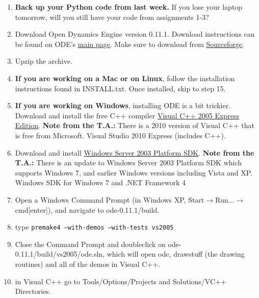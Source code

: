 \documentclass[12pt]{article}
\begin{document}
\begin{enumerate}

\item \textbf{Back up your Python code from last week.} If you lose your laptop tomorrow, will you still have your code from assignments 1-3?

\item Download Open Dynamics Engine version 0.11.1. Download instructions can be found on ODE's
\href{http://ode.org/}{\underline{main page}}. Make sure to download from \href{http://sourceforge.net/projects/opende/files/}{\underline{Sourceforge}}.

\item Upzip the archive.

\item \textbf{If you are working on a Mac or on Linux}, follow the installation instructions found in INSTALL.txt. Once installed, skip to step 15.

\item \textbf{If you are working on Windows}, installing ODE is a bit trickier. Download and install the free C++ compiler
\href{http://www.softpedia.com/get/Programming/Other-Programming-Files/Microsoft-Visual-C-Toolkit.shtml}
{\underline{Visual C++ 2005 Express Edition}}. \textbf{Note from the T.A.:} There is a 2010 version of Visual C++ that is free from Microsoft. Visual Studio 2010 Express (includes C++).

\item Download and install \href{http://www.microsoft.com/downloads/en/details.aspx?FamilyId=0BAF2B35-C656-4969-ACE8-E4C0C0716ADB&displaylang=en}
{\underline{Windows Server 2003 Platform SDK}}. \textbf{Note from the T.A.:} There is an update to Windows Server 2003 Platform SDK which supports Windows 7, and earlier Windows versions including Vista and XP. Windows SDK for Windows 7 and .NET Framework 4


\item Open a Windows Command Prompt (in Windows XP, Start$\rightarrow$Run...$\rightarrow$cmd[enter]), and navigate to ode-0.11.1/build.

\item type \texttt{premake4 --with-demos --with-tests vs2005}

\item Close the Command Prompt and doubleclick on ode-0.11.1/build/vs2005/ode.sln, which will open ode, drawstuff (the drawing routines) and all of the demos in Visual C++.

\item in Visual C++ go to Tools/Options/Projects and Solutions/VC++ Directories.


\end{enumerate}
\end{document}
